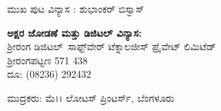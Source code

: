 {{\noindent
ಮುಖ ಪುಟ ವಿನ್ಯಾಸ : ಶುಭಾಂಕರ್ ಬಿಸ್ವಾಸ್ 

\smallskip

\begin{flushleft}
 \textbf{ಅಕ್ಷರ ಜೋಡಣೆ ಮತ್ತು ಡಿಜಿಟಲ್ ವಿನ್ಯಾಸ:}\\\vspace{0.05cm}
 ಶ‍್ರೀರಂಗ ಡಿಜಿಟಲ್\, ಸಾಫ್ಟ್‌ವೇರ್ ಟೆಕ್ನಾಲಜೀಸ್ ಪ್ರೈವೇಟ್ ಲಿಮಿಟೆಡ್\\\vspace{0.05cm}
 ಶ‍್ರೀರಂಗಪಟ್ಟಣ \enginline{-} 571 438\\ \vspace{0.05cm}
 ದೂ: (08236) \enginline{-} 292432\vspace{0.05cm}
\end{flushleft}

\smallskip

\noindent
ಮುದ್ರಕರು: ಮೆ।। ಲೋಟಸ್ ಪ್ರಿಂಟರ್ಸ್, ಬೆಂಗಳೂರು

}}
